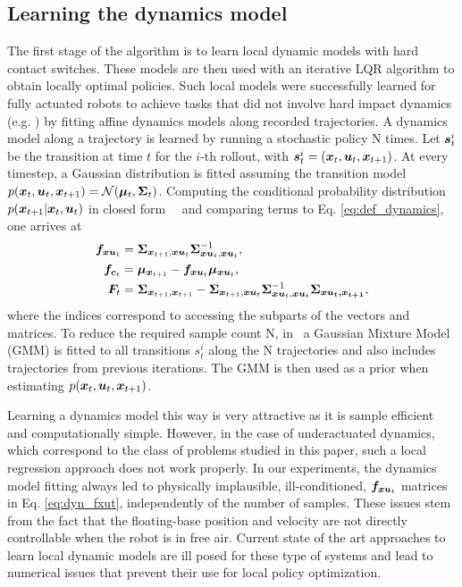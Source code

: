 \subsection{Learning the dynamics model}
The first stage of the algorithm is to learn local dynamic models with hard contact switches. These models are
then used with an iterative LQR algorithm to obtain locally optimal policies.
%
Such local models were successfully learned for fully actuated robots to achieve tasks that did not involve
hard impact dynamics (e.g. \cite{levine2015learning}) by fitting affine dynamics models along recorded trajectories.
A dynamics model along a trajectory is learned by running a stochastic policy N times. Let $\bm{s}^i_t$ be the transition at time $t$ for the $i$-th rollout, with $\bm{s}^i_t=(\bm{x}_{t}, \bm{u}_{t}, \bm{x}_{t + 1})$. At every timestep, a Gaussian distribution is fitted assuming the transition model $p(\bm{x}_{t}, \bm{u}_{t}, \bm{x}_{t + 1}) = \mathcal{N}(\bm{\mu}_t, \bm{\Sigma}_t)$. Computing the conditional probability distribution $p(\bm{x}_{t + 1} | \bm{x}_{t}, \bm{u}_{t})$ in closed form~~\cite[Chapter~2.3]{Bishop:2006:PRM:1162264} and comparing terms to Eq. \eqref{eq:def_dynamics}, one arrives at
%
\begin{align}
\bm{f}_{\bm{xu}_t}   &= \bm{\Sigma}_{\bm{x}_{t + 1}, \bm{xu}_t} \bm{\Sigma}^{-1}_{\bm{xu}_{t}, \bm{xu}_{t}} \label{eq:dyn_fxut}, \\
\bm{f}_{\bm{c}_t}    &= \bm{\mu}_{\bm{x}_{t + 1}} - \bm{f}_{\bm{xu}_t} \bm{\mu}_{\bm{xu}_t} \label{eq:dyn_fct}, \\
\bm{F}_t       &= \label{eq:prob_dyn_covar}
        \bm{\Sigma}_{{\bm{x}_{t + 1}},{\bm{x}_{t + 1}}} - \bm{\Sigma}_{{\bm{x}_{t + 1}}, \bm{xu}_{t}} \bm{\Sigma}_{\bm{xu}_{t}, \bm{xu}_{t}}^{-1} \bm{\Sigma_{\bm{xu}_{t},\bm{x}_{t + 1}}},
\end{align}
%
where the indices correspond to accessing the subparts of the vectors and matrices. To reduce the required sample count N, in~\cite{levine2015learning} a Gaussian Mixture Model (GMM) is fitted to all transitions $s^i_t$ along the N trajectories and also includes trajectories from previous iterations. The GMM is then used as a prior when estimating $p(\bm{x}_{t}, \bm{u}_{t}, \bm{x}_{t + 1})$.

Learning a dynamics model this way is very attractive as it is sample efficient and computationally simple. However, in the case
of underactuated dynamics, which correspond to the class of problems studied in this paper, such a
local regression approach does not work properly.
In our experiments, the dynamics model fitting always led to physically implausible,
ill-conditioned, $\bm{f}_{\bm{xu}_t}$ matrices in Eq. \eqref{eq:dyn_fxut},  independently of the number
of samples.
These issues stem from the fact that the floating-base position and velocity are not directly controllable when the robot is in free air. Current state of the art approaches \cite{levine2015learning} to learn local dynamic models are ill posed for these type of systems and lead to numerical issues that prevent their use for local policy optimization.

